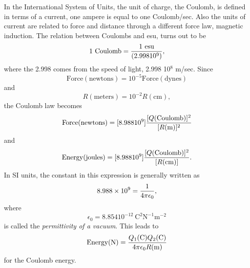In the International System of Units, the unit of charge, the Coulomb, is 
defined in terms of a current, one ampere is equal to one Coulomb/sec. Also 
the units of current are related to force and distance through a different 
force law, magnetic induction. The relation between Coulombs and esu, turns 
out to be
\begin{equation}    
1\ \mathrm{Coulomb} = {1\ \mathrm{esu} \over (2.99810^9)},
\end{equation}
where the 2.998 comes from the speed of light, 2.998 10$^8$ m/sec. Since
\begin{equation}
\mathrm{Force}(\mathrm{newtons}) = 10^{-5}\mathrm{Force}(\mathrm{dynes})
\end{equation}
and
\begin{equation}
R(\mathrm{meters}) = 10^{-2} R(\mathrm{cm}), 
\end{equation}   
the Coulomb law becomes
\begin{equation}    
\mathrm{Force}(\mathrm{newtons}) = [8.98810^9] 
       {[Q(\mathrm{Coulomb})]^2 \over [R(\mathrm{m})]^2}
\end{equation}
and
\begin{equation}
\mathrm{Energy}(\mathrm{joules}) = [8.98810^9] 
         {[Q(\mathrm{Coulomb})]^2 \over [R(\mathrm{cm})]}.
\end{equation}
In SI units, the constant in this expression is generally written as
\begin{equation}   
8.988 \times 10^9 = {1 \over 4 \pi \epsilon_0},
\end{equation}
where
\begin{equation}
\epsilon_0 = 8.85410^{-12}\ \mathrm{C}^2\mathrm{N}^{-1}\mathrm{m}^{-2}
\end{equation}
is called the \emph{permittivity of a vacuum}. This leads to
\begin{equation}
\mathrm{Energy}(\mathrm{N}) = {Q_1(\mathrm{C})Q_2(\mathrm{C})
        \over 4 \pi \epsilon_0 R(\mathrm{m})}
\end{equation}
for the Coulomb energy.
    
